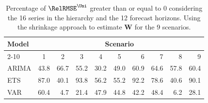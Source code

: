 \begin{table}[!htb]
  \caption{Percentage of $\RelRMSE^{\Uni}$ greater than or equal to 0 considering the 16 series in the hierarchy and the 12 forecast horizons. Using the shrinkage approach to estimate $\bm{W}$ for the 9 scenarios.}
  \centering
  \begin{tabular}{lrrrrrrrrr}
    \hline
    \multirow{2}{*}{Model} & \multicolumn{9}{c}{Scenario} \\ \cline{2-10}
    & \multicolumn{1}{c}{1} & \multicolumn{1}{c}{2} & \multicolumn{1}{c}{3} & \multicolumn{1}{c}{4} & \multicolumn{1}{c}{5} & 6 & 7 & 8 & 9 \\ \hline
    ARIMA & 43.8 & 66.7 & 55.2 & 30.2 & 49.0 & 60.9 & 64.6 & 57.8 & 60.4 \\
    ETS & 87.0 & 40.1 & 93.8 & 56.2 & 55.2 & 92.2 & 78.6 & 40.6 & 90.1 \\
    VAR & 60.4 & 4.7 & 21.4 & 47.9 & 44.8 & 42.2 & 48.4 & 6.2 & 28.1 \\
    \hline
  \end{tabular}%
  \label{tab:porc_sh_uni}
\end{table}
